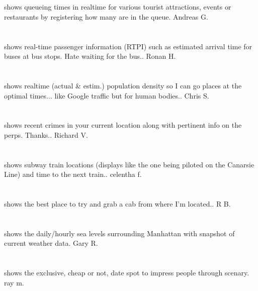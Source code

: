 \section{} shows queueing times in realtime for various tourist attractions,  events or restaurants by registering how many are in the queue. Andreas G.
\section{}shows real-time passenger information (RTPI) such as estimated arrival time for buses at bus stops.  Hate waiting for the bus.. Ronan H.
\section{}shows realtime (actual \& estim.) population density so I can go places at the optimal times... like Google traffic but for human bodies.. Chris S.
\section{}shows recent crimes in your current location along with pertinent info on the perps.  Thanks.. Richard V.
\section{}shows subway train locations (displays like the one being piloted on the Canarsie Line) and time to the next train.. celentha f.
\section{}  shows the best place to try and grab a cab from where I'm located.. R B.
\section{}shows the daily/hourly sea levels surrounding Manhattan with snapshot of current weather data. Gary R.
\section{} shows the exclusive,  cheap or not,  date spot to impress people through scenary. ray m.
